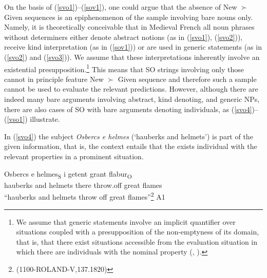 \documentclass[output=paper,modfonts,nonflat]{langsci/langscibook}
\begin{document}
On the basis of (\ref{svo1})--(\ref{sov1}), one could argue that the absence of New $\succ$ Given sequences is an epiphenomenon of the sample involving bare nouns only. Namely, it is theoretically conceivable that in Medieval French all noun phrases without determiners either denote abstract notions (as in (\ref{svo1}), (\ref{svo2})), receive kind interpretation (as in (\ref{sov1})) or are used in generic statements (as in (\ref{svo2}) and (\ref{svo3})). We assume that these interpretations inherently involve an existential presupposition.\footnote{We assume that generic statements involve an implicit quantifier over situations coupled with a presupposition of the non-emptyness of its domain, that is, that there exist situations accessible from the evaluation situation in which there are individuals with the nominal property (\citet{Lee:1995}, \citet{vonFintel:1996}).} This means that SO strings involving only those cannot in principle feature New $\succ$ Given sequence and therefore such a sample cannot be used to evaluate the relevant predictions. However, although there are indeed many bare arguments involving abstract, kind denoting, and generic NPs, there are also cases of SO with bare arguments denoting individuals, as (\ref{svo4})--(\ref{vso1}) illustrate. %

In (\ref{svo4}) the subject {\itshape Osbercs e helmes} (`hauberks and helmets') is part of the given information, that is, the context entails that the exists individual with the relevant properties in a prominent situation.

\ea
\gll Osbercs e helmes\textsubscript{S} i getent grant flabur\textsubscript{O}\\
hauberks and helmets there throw.off great flames\\
\glt ``hauberks and helmets throw off great flames''\footnote{{(1100-ROLAND-V,137.1820)}}\label{svo4} \hfill A1
\z


\end{document}
